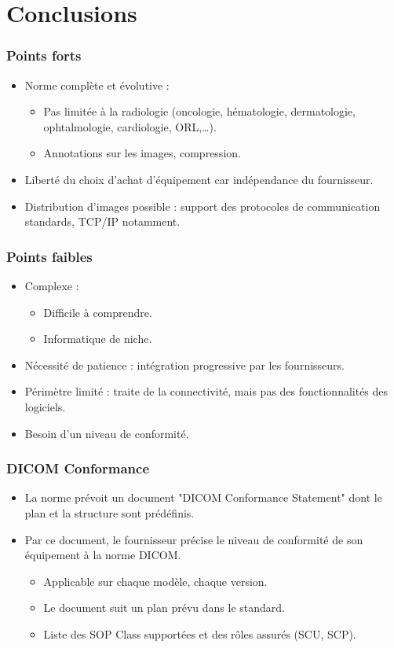 \section{Conclusions}

\frame
{
	\frametitle{Points forts}
	\begin{itemize}
		\item Norme compl\`ete et \'evolutive :
		\begin{itemize}
			\item<2-> Pas limit\'ee \`a la radiologie (oncologie, h\'ematologie, dermatologie, ophtalmologie, cardiologie, ORL,\ldots).
			\item<3-> Annotations sur les images, compression.
		\end{itemize}
		\item<4-> Libert\'e du choix d'achat d'\'equipement car ind\'ependance du fournisseur.
		\item<5-> Distribution d'images possible : support des protocoles de communication standards, TCP/IP notamment.
	\end{itemize}
}

\frame
{
	\frametitle{Points faibles}
	\begin{itemize}
		\item Complexe :
		\begin{itemize}
			\item<2-> Difficile \`a comprendre.
			\item<3-> Informatique de niche.
		\end{itemize}
		\item<4-> N\'ecessit\'e de patience : int\'egration progressive par les fournisseurs.
		\item<5-> P\'erim\`etre limit\'e : traite de la connectivit\'e, mais pas des fonctionnalit\'es des logiciels.
		\item<6-> Besoin d'un niveau de conformit\'e.
	\end{itemize}
}

\frame
{
	\frametitle{DICOM Conformance}
	\begin{itemize}
		\item La norme pr\'evoit un document "DICOM Conformance Statement" dont le plan et la structure sont pr\'ed\'efinis.
		\item<2-> Par ce document, le fournisseur pr\'ecise le niveau de conformit\'e de son \'equipement \`a la norme DICOM.
		\begin{itemize}
			\item<3-> Applicable sur chaque mod\`ele, chaque version.
			\item<4-> Le document suit un plan pr\'evu dans le standard.
			\item<5-> Liste des SOP Class support\'ees et des r\^oles assur\'es (SCU, SCP).
		\end{itemize}
	\end{itemize}
}


